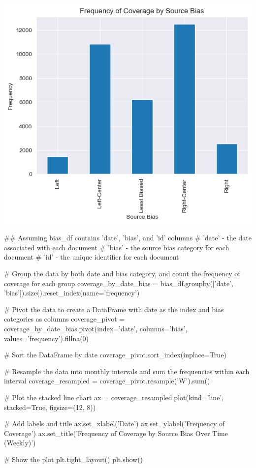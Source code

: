 \includegraphics[width=\textwidth]{./figs/fig_4.png}
\begin{pyin}
\## Assuming bias_df contains 'date', 'bias', and 'id' columns
# 'date' - the date associated with each document
# 'bias' - the source bias category for each document
# 'id' - the unique identifier for each document

# Group the data by both date and bias category, and count the frequency of coverage for each group
coverage_by_date_bias = bias_df.groupby(['date', 'bias']).size().reset_index(name='frequency')

# Pivot the data to create a DataFrame with date as the index and bias categories as columns
coverage_pivot = coverage_by_date_bias.pivot(index='date', columns='bias', values='frequency').fillna(0)

# Sort the DataFrame by date
coverage_pivot.sort_index(inplace=True)

# Resample the data into monthly intervals and sum the frequencies within each interval
coverage_resampled = coverage_pivot.resample('W').sum()

# Plot the stacked line chart
ax = coverage_resampled.plot(kind='line', stacked=True, figsize=(12, 8))

# Add labels and title
ax.set_xlabel('Date')
ax.set_ylabel('Frequency of Coverage')
ax.set_title('Frequency of Coverage by Source Bias Over Time (Weekly)')

# Show the plot
plt.tight_layout()
plt.show()

\end{pyin}

